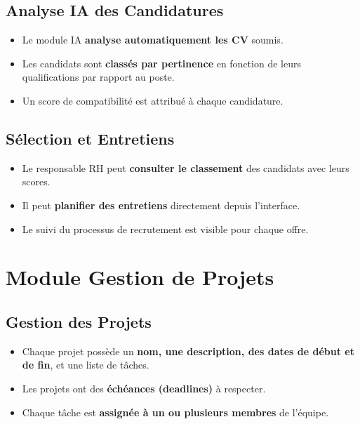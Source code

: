 \documentclass[11pt,a4paper]{report}
\begin{document}
\subsection{Analyse IA des Candidatures}
\begin{tcolorbox}[enhanced, colback=lightgray, colframe=accentcolor, arc=2mm, boxrule=0.5pt, breakable, title={\color{white} Intelligence Artificielle}, fonttitle=\bfseries, coltitle=white, colbacktitle=accentcolor]
    \begin{itemize}
        \item Le module IA \textbf{analyse automatiquement les CV} soumis.
        \item Les candidats sont \textbf{classés par pertinence} en fonction de leurs qualifications par rapport au poste.
        \item Un score de compatibilité est attribué à chaque candidature.
    \end{itemize}
\end{tcolorbox}

\subsection{Sélection et Entretiens}
\begin{tcolorbox}[enhanced, colback=lightgray, colframe=primarycolor, arc=2mm, boxrule=0.5pt, breakable]
    \begin{itemize}
        \item Le responsable RH peut \textbf{consulter le classement} des candidats avec leurs scores.
        \item Il peut \textbf{planifier des entretiens} directement depuis l'interface.
        \item Le suivi du processus de recrutement est visible pour chaque offre.
    \end{itemize}
\end{tcolorbox}

\section{Module Gestion de Projets}

\subsection{Gestion des Projets}
\begin{tcolorbox}[enhanced, colback=lightgray, colframe=primarycolor, arc=2mm, boxrule=0.5pt, breakable]
    \begin{itemize}
        \item Chaque projet possède un \textbf{nom, une description, des dates de début et de fin}, et une liste de tâches.
        \item Les projets ont des \textbf{échéances (deadlines)} à respecter.
        \item Chaque tâche est \textbf{assignée à un ou plusieurs membres} de l'équipe.
    \end{itemize}
\end{tcolorbox}
\end{document}
